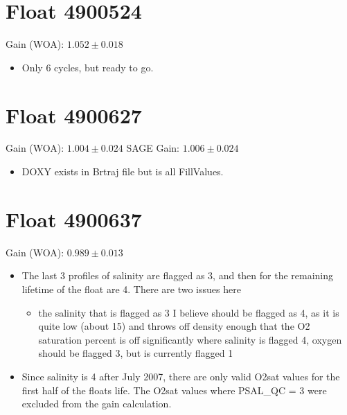\section{Float 4900524}

Gain (WOA): $1.052 \pm 0.018$

\begin{itemize}
	\item Only 6 cycles, but ready to go.
\end{itemize}
\section{Float 4900627}

Gain (WOA): $1.004 \pm 0.024$
SAGE Gain: $1.006 \pm 0.024$

\begin{itemize}
	\item DOXY exists in Brtraj file but is all FillValues.
\end{itemize}
\section{Float 4900637}

Gain (WOA): $0.989 \pm 0.013$

\begin{itemize}
	\item The last 3 profiles of salinity are flagged as 3, and then for the remaining lifetime of the float are 4. There are two issues here
	\begin{itemize}
		\item the salinity that is flagged as 3 I believe should be flagged as 4, as it is quite low (about 15) and throws off density enough that the O2 saturation percent is off significantly where salinity is flagged 4, oxygen should be flagged 3, but is currently flagged 1
	\end{itemize}
	\item Since salinity is 4 after July 2007, there are only valid O2sat values for the first half of the floats life. The O2sat values where PSAL\_QC = 3 were excluded from the gain calculation.
\end{itemize}

